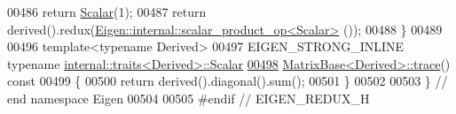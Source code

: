 \begin{DoxyCode}
00486     \textcolor{keywordflow}{return} \hyperlink{group___core___module_a5feed465b3a8e60c47e73ecce83e39a2}{Scalar}(1);
00487   \textcolor{keywordflow}{return} derived().redux(\hyperlink{struct_eigen_1_1internal_1_1scalar__product__op}{Eigen::internal::scalar\_product\_op<Scalar>}
      ());
00488 \}
00489 
00496 \textcolor{keyword}{template}<\textcolor{keyword}{typename} Derived>
00497 EIGEN\_STRONG\_INLINE \textcolor{keyword}{typename} \hyperlink{struct_eigen_1_1internal_1_1traits}{internal::traits<Derived>::Scalar}
\hyperlink{group___core___module_a2cc7a95b161f3a660bdb8ff048b44161}{00498} \hyperlink{group___core___module_a2cc7a95b161f3a660bdb8ff048b44161}{MatrixBase<Derived>::trace}()\textcolor{keyword}{ const}
00499 \textcolor{keyword}{}\{
00500   \textcolor{keywordflow}{return} derived().diagonal().sum();
00501 \}
00502 
00503 \} \textcolor{comment}{// end namespace Eigen}
00504 
00505 \textcolor{preprocessor}{#endif // EIGEN\_REDUX\_H}
\end{DoxyCode}
